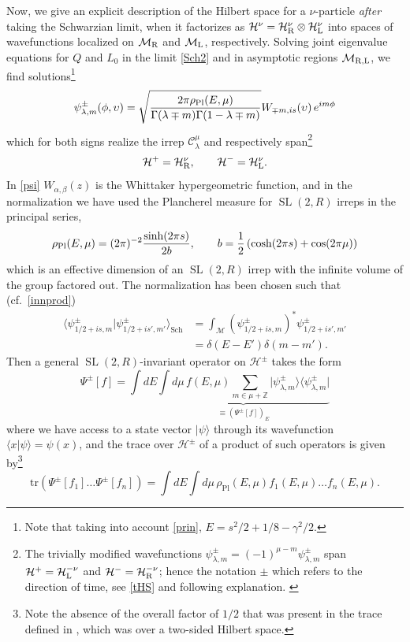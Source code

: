 \documentclass[12pt]{article}
\newcommand{\be}{\begin{equation}}
\newcommand{\ee}{\end{equation}}
\newcommand{\nn}{\nonumber\\}
\newcommand{\blangle}{\bigl\langle}
\newcommand{\brangle}{\bigr\rangle}
\newcommand*{\ket}[1]{|{#1}\rangle}
\newcommand*{\braket}[2]{\langle{#1}|{#2}\rangle}
\newcommand*{\bbra}[1]{\blangle{#1}\big|}
\newcommand*{\bket}[1]{\big|{#1}\brangle}
\newcommand*{\bcorr}[1]{\blangle{#1}\brangle}
\newcommand{\calC}{\mathcal{C}}
\newcommand{\calH}{\mathcal{H}}
\newcommand{\calM}{\mathcal{M}}
\newcommand{\RR}{\mathbb{R}}
\DeclareMathOperator{\tSL}{\widetilde{\mathrm{SL}}}
\newcommand{\al}{\alpha}
\newcommand{\bt}{\beta}
\newcommand{\lam}{\lambda}
\newcommand{\ga}{\gamma}
\newcommand{\Ga}{\Gamma}
\newcommand{\de}{\delta}
\def\cf{cf.\ }
\newcommand{\ov}{\over}
\def\widetilde#1{#1}%
\def\RR{R}
\begin{document}
Now, we give an explicit description of the Hilbert space for a $\nu$-particle \textit{after} taking the Schwarzian limit, when it factorizes as $\calH^{ \nu}=\calH^{ \nu}_{\rm R} \otimes \calH^{ \nu}_{\rm L}$ into spaces of wavefunctions localized on $\cal M_{\rm R}$ and $\cal M_{\rm L}$, respectively.
Solving joint eigenvalue equations for $Q$ and $L_0$ in the limit \eqref{Sch2} and in asymptotic regions $\calM_{\rm R, L}$, we find solutions\footnote{Note that taking into account \eqref{prin}, $E=s^2/2+1/8-\ga^2/2$.}
\be \label{psi}
\psi^{\pm}_{\lam, m}(\phi, \upsilon)=\sqrt{{2\pi \rho_{\text{Pl}}(E, \mu) \ov \Ga(\lam \mp m)\Ga(1-\lam \mp m)}}W_{\mp m, is}(\upsilon)\,e^{im \phi}
\ee
which for both signs realize the irrep $\calC^{\mu}_{\lam}$ and respectively span\footnote{The trivially modified wavefunctions $\widetilde{\psi}^{\pm}_{\lam, m}=(-1)^{\mu-m}\psi^{\pm}_{\lam,m}$ span $\widetilde{\calH}^{+}=\calH^{-\nu}_{\rm L}$ and $\widetilde{\calH}^{-}=\calH^{-\nu}_{\rm R}$; hence the notation $\pm$ which refers to the direction of time, see \eqref{tHS} and following explanation. \label{ospin}}
\be
\calH^{+}=\calH_{\rm R}^{\nu}, \qquad \calH^{-}=\calH_{\rm L}^{\nu}.
\ee
In \eqref{psi} $W_{\al, \bt}(z)$ is the Whittaker hypergeometric function, and in the normalization we have used the Plancherel measure for $\tSL(2,\RR)$ irreps in the principal series,
\be \label{Plm}
\rho_{\text{Pl}}(E,\mu)=(2\pi)^{-2} {\sinh (2 \pi s) \ov 2 b}, \qquad b={1 \over 2}\left( \cosh(2\pi s)+\cos (2\pi \mu)\right)
\ee
which is an effective dimension of an $\tSL(2,\RR)$ irrep with the infinite volume of the group factored out. The normalization has been chosen such that (\cf \eqref{innprod})
\begin{align}
\bcorr{\psi_{1/2+ is, m}^{\pm} | \psi^{\pm}_{1/2+is', m'}}_{\text{Sch}}&=\int_{\calM} \left(\psi^{\pm}_{1/2+is, m}\right)^*\psi^{\pm}_{1/2+i s', m'}\nn
&=\de(E-E')\de(m-m').
\end{align}
Then a general $\tSL(2,\RR)$-invariant operator on $\calH^{\pm}$ takes the form
\be \label{op}
\Psi^{\pm}[f]=\int dE \underbrace{\int d\mu\, f(E, \mu) \sum_{m \in \mu + \mathbb{Z}} \bket{\psi^{\pm}_{\lambda, m}}\bbra{ \psi^{\pm}_{\lambda, m}}}_{\equiv \left(\Psi^{\pm}[f]\right)_E}
\ee
where we have access to a state vector $\ket{\psi}$ through its wavefunction $\braket{x  }{\psi}=\psi(x)$, and the trace over $\calH^{\pm}$ of a product of such operators is given by\footnote{Note the absence of the overall factor of $1/2$ that was present in the trace defined in \cite{KiSuh18}, which was over a two-sided Hilbert space.}
\be \label{trdef}
\text{tr} (\Psi^{\pm}[f_1]\dots\Psi^{\pm}[f_n])=\int dE \int d\mu\, \rho_{\text{Pl}}(E, \mu) f_1(E, \mu)\dots f_n (E, \mu).
\ee
\end{document}
